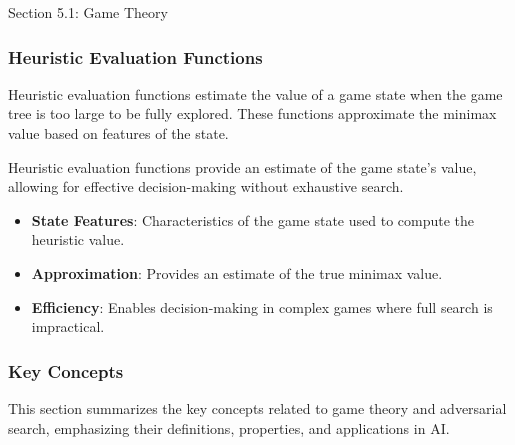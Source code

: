 \begin{notes}{Section 5.1: Game Theory}
    \subsubsection*{Heuristic Evaluation Functions}
    
    Heuristic evaluation functions estimate the value of a game state when the game tree is too large to be fully explored. These functions approximate the minimax value based on features of the state.
    
    \begin{highlight}
        Heuristic evaluation functions provide an estimate of the game state's value, allowing for effective decision-making without exhaustive search.
        
        \begin{itemize}
            \item \textbf{State Features}: Characteristics of the game state used to compute the heuristic value.
            \item \textbf{Approximation}: Provides an estimate of the true minimax value.
            \item \textbf{Efficiency}: Enables decision-making in complex games where full search is impractical.
        \end{itemize}
    \end{highlight}
    
    \subsubsection*{Key Concepts}
    
    \begin{highlight}
        This section summarizes the key concepts related to game theory and adversarial search, emphasizing their definitions, properties, and applications in AI.
        

\end{highlight}
\end{notes}
